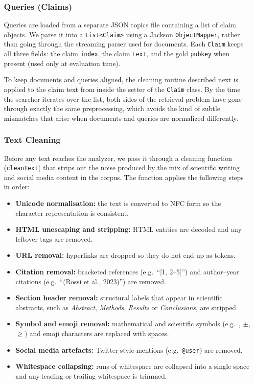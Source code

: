 \subsubsection{Queries (Claims)}

Queries are loaded from a separate JSON topics file containing a list of claim objects. We parse it into a \texttt{List<Claim>} using a Jackson \texttt{ObjectMapper}, rather than going through the streaming parser used for documents. Each \texttt{Claim} keeps all three fields: the claim \texttt{index}, the claim \texttt{text}, and the gold \texttt{pubkey} when present (used only at evaluation time).

To keep documents and queries aligned, the cleaning routine described next is applied to the claim text from inside the setter of the \texttt{Claim} class. By the time the searcher iterates over the list, both sides of the retrieval problem have gone through exactly the same preprocessing, which avoids the kind of subtle mismatches that arise when documents and queries are normalized differently.
\newpage
\subsubsection{Text Cleaning}

Before any text reaches the analyzer, we pass it through a cleaning function (\texttt{cleanText}) that strips out the noise produced by the mix of scientific writing and social media content in the corpus. The function applies the following steps in order:

\begin{itemize}
    \item \textbf{Unicode normalisation:} the text is converted to NFC form so the character representation is consistent.
    \item \textbf{HTML unescaping and stripping:} HTML entities are decoded and any leftover tags are removed.
    \item \textbf{URL removal:} hyperlinks are dropped so they do not end up as tokens.
    \item \textbf{Citation removal:} bracketed references (e.g.\ ``[1, 2--5]'') and author--year citations (e.g.\ ``(Rossi et al., 2023)'') are removed.
    \item \textbf{Section header removal:} structural labels that appear in scientific abstracts, such as \textit{Abstract}, \textit{Methods}, \textit{Results} or \textit{Conclusions}, are stripped.
    \item \textbf{Symbol and emoji removal:} mathematical and scientific symbols (e.g.\ \textdegree, $\pm$, $\geq$) and emoji characters are replaced with spaces.
    \item \textbf{Social media artefacts:} Twitter-style mentions (e.g.\ \texttt{@user}) are removed.
    \item \textbf{Whitespace collapsing:} runs of whitespace are collapsed into a single space and any leading or trailing whitespace is trimmed.
\end{itemize}

